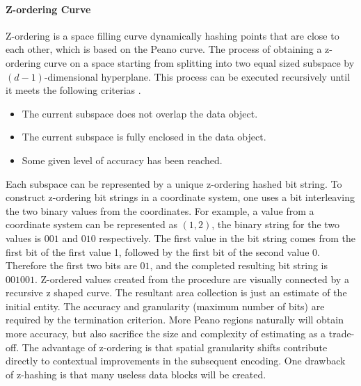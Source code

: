 \paragraph{Z-ordering Curve}
Z-ordering \cite{Orenstein:1984jq} is a space filling curve dynamically hashing points that are close to each other, which is based on the Peano curve. The process of obtaining a z-ordering curve on a space starting from splitting into two equal sized subspace by ${(d-1)}$-dimensional hyperplane. This process can be executed recursively until it meets the following criterias \cite{Gaede:1998fp}. 

\begin{itemize}
    \item The current subspace does not overlap the data object.
    \item The current subspace is fully enclosed in the data object.
    \item Some given level of accuracy has been reached.
\end{itemize}

Each subspace can be represented by a unique z-ordering hashed bit string. To construct z-ordering bit strings in a coordinate system, one uses a bit interleaving the two binary values from the coordinates. For example, a value from a coordinate system can be represented as $(1, 2)$, the binary string for the two values is $001$ and $010$ respectively. The first value in the bit string comes from the first bit of the first value 1, followed by the first bit of the second value $0$. Therefore the first two bits are $01$, and the completed resulting bit string is $001001$. Z-ordered values created from the procedure are visually connected by a recursive z shaped curve. The resultant area collection is just an estimate of the initial entity. The accuracy and granularity (maximum number of bits) are required by the termination criterion. More Peano regions naturally will obtain more accuracy, but also sacrifice the size and complexity of estimating as a trade-off. The advantage of z-ordering is that spatial granularity shifts contribute directly to contextual improvements in the subsequent encoding. One drawback of z-hashing is that many useless data blocks will be created.

